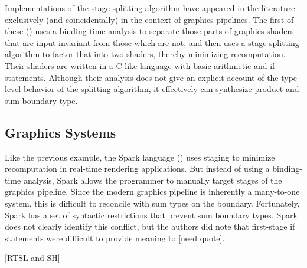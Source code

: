 Implementations of the stage-splitting algorithm have appeared in the literature exclusively (and coincidentally) in the context of graphics pipelines.  The first of these (\cite{knoblock96}) uses a binding time analysis to separate those parts of graphics shaders that are input-invariant from those which are not, and then uses a stage splitting algorithm to factor that into two shaders, thereby minimizing recomputation.  Their shaders are written in a C-like language with basic arithmetic and if statements.  Although their analysis does not give an explicit account of the type-level behavior of the splitting algorithm, it effectively can synthesize product and sum boundary type.  

\subsection{Graphics Systems}

Like the previous example, the Spark language (\cite{sparkThesis}) uses staging to minimize recomputation in real-time rendering applications.  But instead of using a binding-time analysis, Spark allows the programmer to manually target stages of the graphics pipeline.  Since the modern graphics pipeline is inherently a many-to-one system, this is difficult to reconcile with sum types on the boundary.  Fortunately, Spark has a set of syntactic restrictions that prevent sum boundary types.  Spark does not clearly identify this conflict, but the authors did note that first-stage if statements were difficult to provide meaning to [need quote].

[RTSL and SH]


